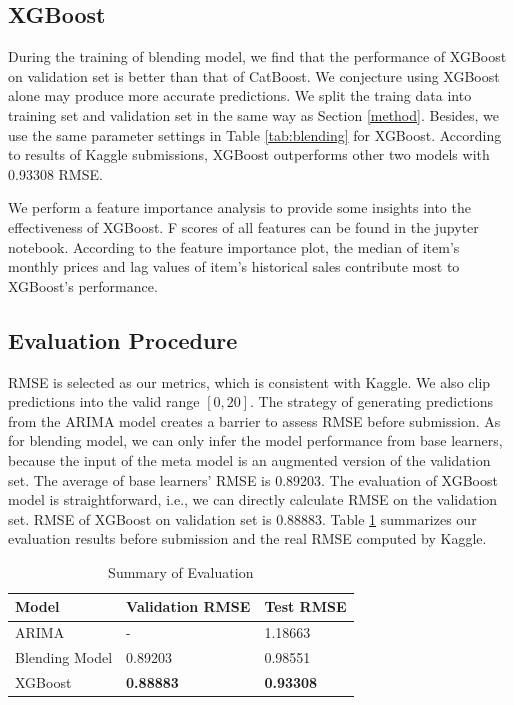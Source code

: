 \documentclass{article}
\begin{document}
\subsection{XGBoost}
During the training of blending model, we find that the performance of XGBoost on validation set is better than that of CatBoost. We conjecture using XGBoost alone may produce more accurate predictions. We split the traing data into training set and validation set in the same way as Section \ref{method}. Besides, we use the same parameter settings in Table \ref{tab:blending} for XGBoost. According to results of Kaggle submissions, XGBoost outperforms other two models with 0.93308 RMSE.\par

We perform a feature importance analysis to provide some insights into the effectiveness of XGBoost. F scores of all features can be found in the jupyter notebook. According to the feature importance plot, the median of item's monthly prices and lag values of item's historical sales contribute most to XGBoost's performance.

\subsection{Evaluation Procedure}
RMSE is selected as our metrics, which is consistent with Kaggle. We also clip predictions into the valid range $[0, 20]$. The strategy of generating predictions from the ARIMA model creates a barrier to assess RMSE before submission. As for blending model, we can only infer the model performance from base learners, because the input of the meta model is an augmented version of the validation set. The average of base learners' RMSE is 0.89203. The evaluation of XGBoost model is straightforward, i.e., we can directly calculate RMSE on the validation set. RMSE of XGBoost on validation set is 0.88883. Table \ref{tab:evaluation} summarizes our evaluation results before submission and the real RMSE computed by Kaggle.

\begin{table}[!ht]
    \centering
    \caption{Summary of Evaluation}
    \label{tab:evaluation}
    \begin{tabular}{lll}
        \toprule
        \textbf{Model} & \textbf{Validation RMSE} & \textbf{Test RMSE}\\
        \midrule
        ARIMA & - & 1.18663\\
        Blending Model & 0.89203 & 0.98551\\
        XGBoost & \textbf{0.88883} & \textbf{0.93308}\\
        \bottomrule
    \end{tabular}
\end{table}
\end{document}
